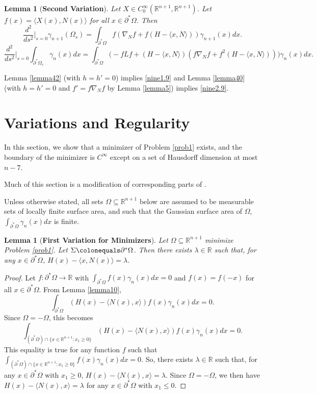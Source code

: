 \documentclass[12pt,reqno]{amsart}
\newtheorem{lemma}[theorem]{Lemma}
\theoremstyle{definition}
\renewcommand{\subset}{\subseteq}
\newcommand{\R}{\mathbb{R}}
\newcommand{\embolden}[1]{\textbf {#1}}
\newcommand{\redA}{\partial^{*}\Omega}
\newcommand{\redb}{\partial^{*}}
\newcommand{\sdimn}{n}
\newcommand{\adimn}{n+1}
\newcommand{\scon}{\lambda}
\begin{document}
\begin{lemma}[\embolden{Second Variation}]\label{lemma10.5}  Let $X\in C_{0}^{\infty}(\R^{\adimn},\R^{\adimn})$.  Let $f(x)=\langle X(x),N(x)\rangle$ for all $x\in\redA$.  Then
\begin{equation}\label{nine1.9}
\frac{d^{2}}{ds^{2}}|_{s=0}\gamma_{\adimn}(\Omega_{s})=\int_{\redA}f(\nabla_{N}f+f(H-\langle x,N\rangle))\gamma_{\adimn}(x)dx.
\end{equation}
\begin{equation}\label{nine2.9}
\frac{d^{2}}{ds^{2}}|_{s=0}\int_{\redb \Omega_{s}}\gamma_{\sdimn}(x)dx
=\int_{\redA}\Big(-fLf+(H-\langle x,N\rangle)(f\nabla_{N}f+f^{2}(H-\langle x,N\rangle))\Big)\gamma_{\sdimn}(x)dx.
\end{equation}
\end{lemma}

Lemma \ref{lemma42} (with $h=h'=0$) implies \eqref{nine1.9} and Lemma \ref{lemma40} (with $h=h'=0$ and $f'=f\nabla_{N}f$ by Lemma \ref{lemma5}) implies \eqref{nine2.9}.




\section{Variations and Regularity}

In this section, we show that a minimizer of Problem \ref{prob1} exists, and the boundary of the minimizer is $C^{\infty}$ except on a set of Hausdorff dimension at most $n-7$.

Much of this section is a modification of corresponding parts of \cite{barchiesi16}.


Unless otherwise stated, all sets $\Omega\subset\R^{\adimn}$ below are assumed to be measurable sets of locally finite surface area, and such that the Gaussian surface area of $\Omega$, $\int_{\redA}\gamma_{\sdimn}(x)dx$ is finite.



\begin{lemma}[\embolden{First Variation for Minimizers}]\label{varlem}
Let $\Omega\subset\R^{\adimn}$ minimize Problem \ref{prob1}.  Let $\Sigma\colonequals\redA$.  Then there exists $\scon\in\R$ such that, for any $x\in\redA$, $H(x)-\langle x,N(x)\rangle=\scon$.
\end{lemma}
\begin{proof}
Let $f\colon\redA\to\R$ with $\int_{\redA}f(x)\gamma_{\sdimn}(x)dx=0$ and $f(x)=f(-x)$ for all $x\in\redA$.  From Lemma \ref{lemma10},
$$\int_{\redA}(H(x)-\langle N(x),x\rangle)f(x)\gamma_{\sdimn}(x)dx=0.$$
Since $\Omega=-\Omega$, this becomes
$$\int_{(\redA)\cap\{x\in\R^{\adimn}\colon x_{1}\geq0\}}(H(x)-\langle N(x),x\rangle)f(x)\gamma_{\sdimn}(x)dx=0.$$
This equality is true for any function $f$ such that $\int_{(\redA)\cap\{x\in\R^{\adimn}\colon x_{1}\geq0\}}f(x)\gamma_{\sdimn}(x)dx=0$.  So, there exists $\scon\in\R$ such that, for any $x\in\redA$ with $x_{1}\geq0$, $H(x)-\langle N(x),x\rangle=\scon$.  Since $\Omega=-\Omega$, we then have $H(x)-\langle N(x),x\rangle=\scon$ for any $x\in\redA$ with $x_{1}\leq0$.
\end{proof}
\end{document}
